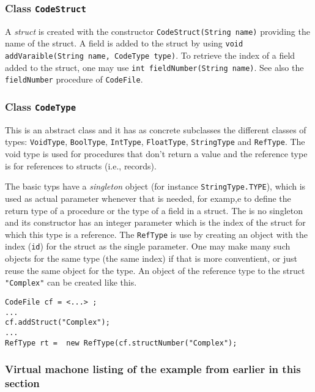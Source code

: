 \documentclass[11pt]{article}
\begin{document}
\subsubsection{Class \texttt{CodeStruct}}
\label{sec:org28c17cd}

A \emph{struct} is created with the constructor \texttt{CodeStruct(String name)}
providing the name of the struct. A field is added to the struct by using
\texttt{void addVaraible(String name, CodeType type)}. To retrieve the index of a
field added to the struct, one may use \texttt{int fieldNumber(String name)}. See
also the \texttt{fieldNumber} procedure of \texttt{CodeFile}.

\subsubsection{Class \texttt{CodeType}}
\label{sec:org9b26358}

This is an abstract class and it has as concrete subclasses the different
classes of types: \texttt{VoidType}, \texttt{BoolType}, \texttt{IntType}, \texttt{FloatType},
\texttt{StringType} and \texttt{RefType}. The void type is used for procedures that don't
return a value and the reference type is for references to structs (i.e.,
records).


The basic typs have a \emph{singleton} object (for instance \texttt{StringType.TYPE}),
which is used as actual parameter whenever that is needed, for examp,e to
define the return type of a procedure or the type of a field in a
struct. The is no singleton and its constructor has an integer parameter
which is the index of the struct for which this type is a reference. The
\texttt{RefType} is use by creating an object with the index (\texttt{id}) for the struct
as the single parameter. One may make many such objects for the same type
(the same index) if that is more conventient, or just reuse the same object
for the type. An object of the reference type to the struct \texttt{"Complex"} can
be created like this.


\lstset{language=java,label= ,caption= ,captionpos=b,numbers=none}
\begin{lstlisting}
CodeFile cf = <...> ;
...
cf.addStruct("Complex");
...
RefType rt =  new RefType(cf.structNumber("Complex");
\end{lstlisting}



\subsubsection{Virtual machone listing of the example from earlier in this section}
\label{sec:org8bb26c1}
\end{document}
